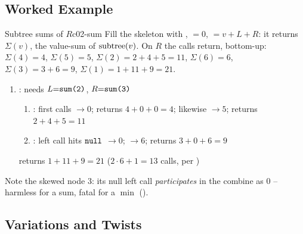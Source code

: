 \subsection{Worked Example}

\begin{example}{Subtree sums of $R$}{c02-sum}
Fill the skeleton with  , $=0$,
$=v+L+R$: it returns $\Sigma(v)$, the value-sum of $\operatorname{subtree}(v)$. On
$R$ the calls return, bottom-up: $\Sigma(4){=}4$, $\Sigma(5){=}5$,
$\Sigma(2){=}2{+}4{+}5{=}11$, $\Sigma(6){=}6$, $\Sigma(3){=}3{+}6{=}9$,
$\Sigma(1){=}1{+}11{+}9{=}21$.
\end{example}

\begin{tracebox}
\begin{enumerate}[nosep, leftmargin=1.8em]
  \item {}: needs $L{=}\text{\texttt{sum(2)}}$, $R{=}\text{\texttt{sum(3)}}$
    \begin{enumerate}[nosep,label=(\alph*),leftmargin=1.4em]
      \item {}:  first calls  $\to 0$;
             returns $4{+}0{+}0=4$; likewise
            $\to5$;  returns $2{+}4{+}5=11$
      \item {}: left call hits $\texttt{null}$ $\to 0$;
            $\to6$; returns $3{+}0{+}6=9$
    \end{enumerate}
    returns $1+11+9 = 21$ \hfill ($2\cdot6+1 = 13$ calls, per )
\end{enumerate}
Note the skewed node $3$: its null left call \emph{participates} in the combine as
$0$ -- harmless for a sum, fatal for a $\min$ ().
\end{tracebox}

\subsection{Variations and Twists}

